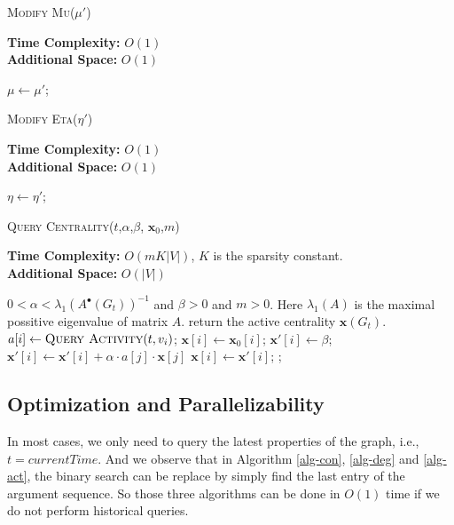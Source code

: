 \documentclass[12pt,abstract=true]{scrartcl}
\numberwithin{equation}{section}
\theoremstyle{definition}   \newtheorem{definition}{Definition}[section]
\theoremstyle{plain}        \newtheorem{theorem}{Theorem}[section]
\theoremstyle{plain}        \newtheorem{observation}{Observation}[section]
\theoremstyle{plain}        \newtheorem{fact}{Fact}[section]
\theoremstyle{plain}        \newtheorem{claim}{Claim}[section]
\theoremstyle{plain}        \newtheorem{lemma}[theorem]{Lemma}
\theoremstyle{plain}        \newtheorem{corollary}[theorem]{Corollary}
\theoremstyle{remark}       \newtheorem{example}{Example}[section]
\theoremstyle{remark}       \newtheorem{remark}{Remark}[section]
\begin{document}
\begin{algorithm}[htbp]
\caption{\textsc{Modify Mu}($\mu'$)}
\label{alg-mu}
\textbf{Time Complexity:} $O(1)$\\
\textbf{Additional Space:} $O(1)$
\begin{algorithmic}[1]
\State $\mu\gets\mu'$;
\end{algorithmic}
\end{algorithm}

\begin{algorithm}[htbp]
\caption{\textsc{Modify Eta}($\eta'$)}
\label{alg-eta}
\textbf{Time Complexity:} $O(1)$\\
\textbf{Additional Space:} $O(1)$
\begin{algorithmic}[1]
\State $\eta\gets\eta'$;\State{}
\end{algorithmic}
\end{algorithm}


\begin{algorithm}[htbp]
\caption{\textsc{Query Centrality}($t$,$\alpha$,$\beta$,
$\mathbf{x}_0$,$m$)}
\label{alg-cen}
\textbf{Time Complexity:} $O(mK|V|)$, $K$ is the sparsity constant.\\
\textbf{Additional Space:} $O(|V|)$
\begin{algorithmic}[1]
\Require $0<\alpha<\lambda_1(A^\bullet(G_t))^{-1}$ and $\beta>0$ and $m>0$. Here
$\lambda_1(A)$ is the maximal possitive eigenvalue of matrix $A$.
\Ensure return the active centrality $\mathbf{x}(G_t)$.
\State $a[i]\gets \Call{Query Activity}{t,v_i}$;
\State $\mathbf{x}[i]\gets \mathbf{x}_0[i]$;
\EndFor
{}
\State $\mathbf{x'}[i]\gets \beta$;
\EndFor
{}
\State $\mathbf{x'}[i]\gets \mathbf{x'}[i]+\alpha\cdot a[j]\cdot\mathbf{x}[j]$
\EndFor\EndFor
{}
\State $\mathbf{x}[i]\gets \mathbf{x'}[i]$;
\EndFor
\EndFor
\State{};
\end{algorithmic}
\end{algorithm}

\subsection{Optimization and Parallelizability}

In most cases, we only need to query the latest properties of the graph, i.e.,
$t=\mathit{currentTime}$. And we observe that in Algorithm \ref{alg-con},
\ref{alg-deg} and \ref{alg-act}, the binary search can be replace by simply find
the last entry of the argument sequence. So those three algorithms can be done
in $O(1)$ time if we do not perform historical queries.
\end{document}
